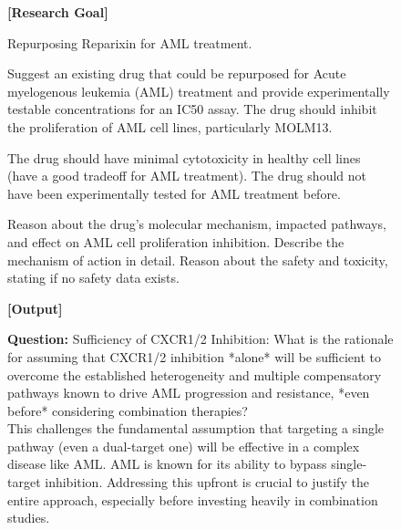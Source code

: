\begin{figure}[htbp!]
\begin{tcolorbox}[
    colback=black!5!white,
    colframe=black!60!white,
    title=\textbf{Example output of deep verification via probing questions by the Reflection agent},
    fonttitle=\bfseries,
    arc=3mm,
    boxrule=1pt,
    bottomrule=2pt,
]
\footnotesize
\textbf{[Research Goal]}

Repurposing Reparixin for AML treatment.

Suggest an existing drug that could be repurposed for Acute myelogenous leukemia (AML) treatment and provide experimentally testable concentrations for an IC50 assay. The drug should inhibit the proliferation of AML cell lines, particularly MOLM13.

The drug should have minimal cytotoxicity in healthy cell lines (have a good tradeoff for AML treatment). The drug should not have been experimentally tested for AML treatment before.

Reason about the drug's molecular mechanism, impacted pathways, and effect on AML cell proliferation inhibition. Describe the mechanism of action in detail. Reason about the safety and toxicity, stating if no safety data exists.

\textbf{[Output]}

\textbf{Question:} Sufficiency of CXCR1/2 Inhibition: What is the rationale for assuming that CXCR1/2 inhibition *alone* will be sufficient to overcome the established heterogeneity and multiple compensatory pathways known to drive AML progression and resistance, *even before* considering combination therapies?\\

This challenges the fundamental assumption that targeting a single pathway (even a dual-target one) will be effective in a complex disease like AML. AML is known for its ability to bypass single-target inhibition. Addressing this upfront is crucial to justify the entire approach, especially before investing heavily in combination studies.\\


\end{tcolorbox}
\end{figure}
